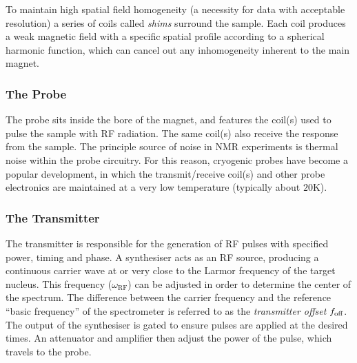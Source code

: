 To maintain high spatial field homogeneity (a necessity for data with
acceptable resolution) a series of coils called \textit{shims} surround the
sample. Each coil produces a weak magnetic field with a specific spatial
profile according to a spherical harmonic function, which can cancel out any
inhomogeneity inherent to the main magnet.

\subsubsection{The Probe}
The probe sits inside the bore of the magnet, and features the coil(s) used to
pulse the sample with \ac{RF} radiation. The same coil(s) also
receive the response from the sample. The principle source of noise in
\ac{NMR} experiments is thermal noise within the probe circuitry. For
this reason, cryogenic probes\cite{Kovacs2020} have become a popular
development, in which the transmit/receive coil(s) and other probe electronics
are maintained at a very low temperature (typically about $\num{20}
\si{\kelvin}$).

\subsubsection{The Transmitter}
The transmitter is responsible for the generation of \ac{RF} pulses
with specified power, timing and phase.
A synthesiser acts as an \ac{RF} source, producing a continuous carrier wave at
or very close to the Larmor frequency of the target nucleus. This frequency
($\omega_{\text{RF}}$) can be adjusted in order to determine the center of the
spectrum. The difference between the carrier frequency and the reference
``basic frequency'' of the spectrometer is referred to as the \emph{transmitter
offset} $f_{\text{off}}$.  The output of the synthesiser is gated to ensure pulses are
applied at the desired times. An attenuator and amplifier then adjust the power
of the pulse, which travels to the probe.

